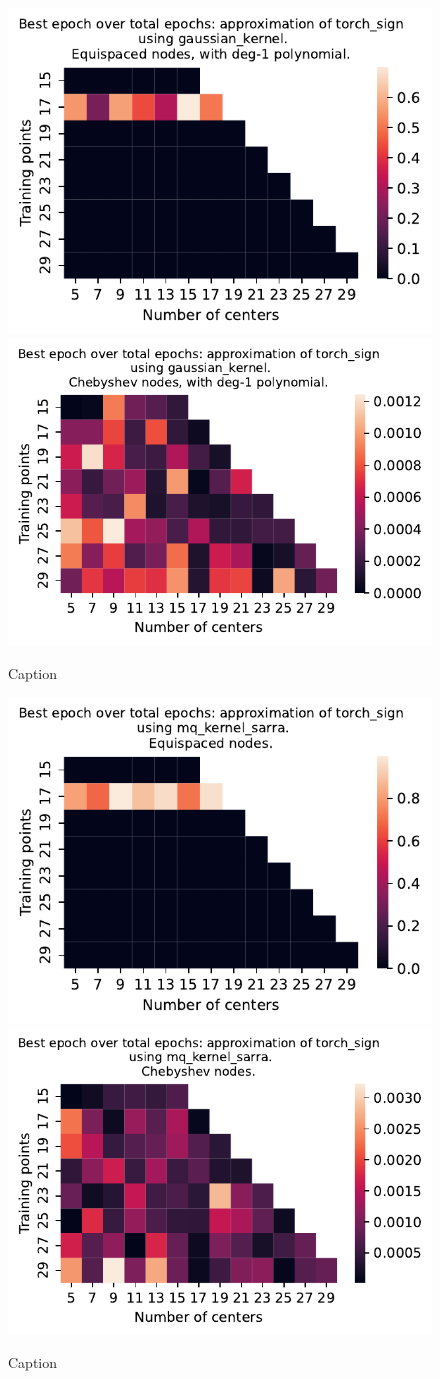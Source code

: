 \documentclass[12pt]{report} %
\begin{document}
\begin{figure}[ht]
    \centering
    
    \includegraphics[width=.49\textwidth]{imagenes/experiments/1d/variational_epochs/torch_sign-Kgaussian_kernel-Poly-Equi-epochs.pdf}
    \includegraphics[width=.49\textwidth]{imagenes/experiments/1d/variational_epochs/torch_sign-Kgaussian_kernel-Poly-Cheb-epochs.pdf}
    \caption{Caption}
    \label{fig:epochs-torch-sign-gaussian-poly}
\end{figure}


\begin{figure}[ht]
    \centering
    
    \includegraphics[width=.49\textwidth]{imagenes/experiments/1d/variational_epochs/torch_sign-Kmq_kernel_sarra-Equi-epochs.pdf}
    \includegraphics[width=.49\textwidth]{imagenes/experiments/1d/variational_epochs/torch_sign-Kmq_kernel_sarra-Cheb-epochs.pdf}
    \caption{Caption}
    \label{fig:epochs-torch-sign-sarra}
\end{figure}
\end{document}
